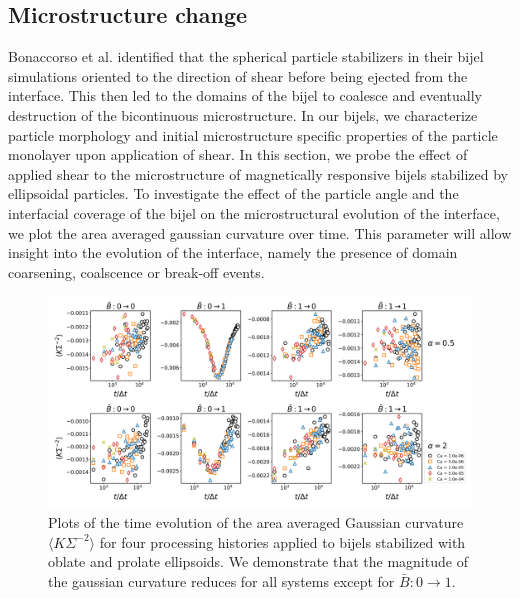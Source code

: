 \subsection{Microstructure change}

Bonaccorso et al. identified that the spherical particle stabilizers in their bijel simulations oriented to the direction of shear before being
ejected from the interface. \cite{bonaccorso_shear_2020} This then led to the domains of the bijel to coalesce and eventually destruction of the
bicontinuous microstructure. \cite{bonaccorso_shear_2020} In our bijels, we characterize particle morphology and initial microstructure specific 
properties of the particle monolayer upon application of shear. 
In this section, we probe the effect of applied shear to the microstructure of magnetically
responsive bijels stabilized by ellipsoidal particles. To investigate the effect of the particle angle and the interfacial coverage of the bijel on the
microstructural evolution of the interface, we plot the area averaged gaussian curvature over time. This parameter will allow insight into the evolution 
of the interface, namely the presence of domain coarsening, coalscence or break-off events.

\begin{figure} 
    \centering 
    \includegraphics[scale=0.3]{../figures/results/paper3/gaussian-time_compare.png} 
    \caption{Plots of the time evolution of the area averaged Gaussian curvature $\langle K \Sigma^{-2} \rangle$ for four 
             processing histories applied to bijels stabilized with oblate and prolate ellipsoids. We demonstrate that the 
             magnitude of the gaussian curvature reduces for all systems except for $\bar{B}: 0 \to 1$.} 
    \label{fig:gaussian_curvature_time_shear} 
\end{figure}

